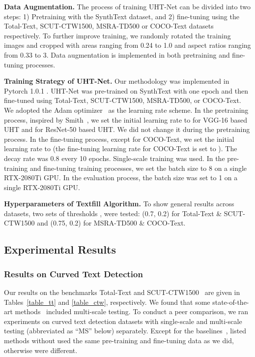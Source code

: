 \documentclass[10pt,twocolumn,letterpaper]{article}
\begin{document}
\textbf{Data Augmentation.}
The process of training UHT-Net can be divided into two steps: 1) Pretraining with the SynthText dataset, and 2) fine-tuning using the Total-Text, SCUT-CTW1500, MSRA-TD500 or COCO-Text datasets respectively. To further improve  training, we randomly rotated the training images and cropped with areas ranging from 0.24 to 1.0 and aspect ratios ranging from 0.33 to 3. Data augmentation is implemented in both pretraining and fine-tuning processes.

\textbf{Training Strategy of UHT-Net.}
Our methodology was implemented in Pytorch 1.0.1 \cite{pytorch}. UHT-Net was pre-trained on SynthText with one epoch and then fine-tuned using Total-Text, SCUT-CTW1500, MSRA-TD500, or COCO-Text. We adopted the Adam optimizer~\cite{adam} as the learning rate scheme. In the pretraining process, inspired by Smith~\cite{cyc_lr}, we set the initial learning rate to  for VGG-16 based UHT and  for ResNet-50 based UHT. We did not change it during the pretraining process. In the fine-tuning process, except for COCO-Text, we set the initial learning rate to  (the fine-tuning learning rate for COCO-Text is set to ). The decay rate was 0.8 every 10 epochs. Single-scale training was used. In the pre-training and fine-tuning training processes, we set the batch size to 8 on a single RTX-2080Ti GPU. In the evaluation process, the batch size was set to 1 on a single RTX-2080Ti GPU.

\textbf{Hyperparameters of Textfill Algorithm.}
To show gen\-er\-al results across datasets, two sets of thresholds ,  were tested: (0.7, 0.2) for Total-Text \& SCUT-CTW1500 and (0.75, 0.2) for MSRA-TD500 \& COCO-Text.

\subsection{Experimental Results}


\subsubsection{Results on Curved Text Detection}
Our results on the benchmarks Total-Text \cite{total-text} and SCUT-CTW1500~\cite{scut-ctw1500} are given in 
Tables~\ref{table_tt} and \ref{table_ctw}, respectively. 
We found that some state-of-the-art methods~\cite{charnet,lomo-ms} included multi-scale testing. To conduct a peer comparison, we ran experiments on curved text detection datasets with single-scale and multi-scale testing (abbreviated as ``MS'' below) separately. Except for the baselines~\cite{total-text, scut-ctw1500}, listed methods without  used the same pre-training and fine-tuning data as we did, otherwise were different.
\end{document}
